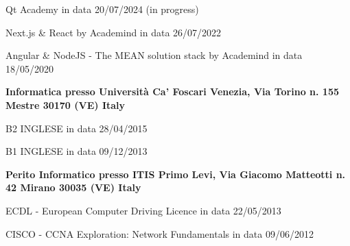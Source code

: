 
\begin{scholarship}
    {Qt Academy in data 20/07/2024 (in progress)}

    {Next.js \& React by Academind in data 26/07/2022}

    {Angular \& NodeJS - The MEAN solution stack by Academind in data 18/05/2020}

    {\textbf{Informatica presso Università Ca' Foscari Venezia, Via Torino n. 155 Mestre 30170 (VE) Italy}}

    {B2 INGLESE in data 28/04/2015}

    {B1 INGLESE in data 09/12/2013}

    {\textbf{Perito Informatico presso ITIS Primo Levi, Via Giacomo Matteotti n. 42 Mirano 30035 (VE) Italy}}

    {ECDL - European Computer Driving Licence in data 22/05/2013}

    {CISCO - CCNA Exploration: Network Fundamentals in data 09/06/2012}
\end{scholarship}
